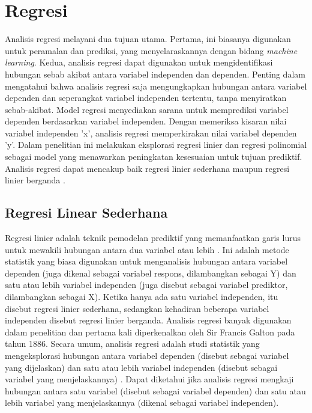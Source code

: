 \section{Regresi}
\label{sec:regresi}

Analisis regresi melayani dua tujuan utama. Pertama, ini biasanya digunakan untuk peramalan dan prediksi, yang menyelaraskannya dengan bidang \emph{machine learning}. Kedua, analisis regresi dapat digunakan untuk mengidentifikasi hubungan sebab akibat antara variabel independen dan dependen. Penting dalam mengatahui bahwa analisis regresi saja mengungkapkan hubungan antara variabel dependen dan seperangkat variabel independen tertentu, tanpa menyiratkan sebab-akibat. Model regresi menyediakan sarana untuk memprediksi variabel dependen berdasarkan variabel independen. Dengan memeriksa kisaran nilai variabel independen 'x', analisis regresi memperkirakan nilai variabel dependen 'y'. Dalam penelitian ini melakukan eksplorasi regresi linier dan regresi polinomial sebagai model yang menawarkan peningkatan kesesuaian untuk tujuan prediktif. Analisis regresi dapat mencakup baik regresi linier sederhana maupun regresi linier berganda \parencite{Maulud}.

\subsection{Regresi Linear Sederhana}
\label{subsec:regresilinearsederhana}

Regresi linier adalah teknik pemodelan prediktif yang memanfaatkan garis lurus untuk mewakili hubungan antara dua variabel atau lebih \parencite{Kurniawan}. Ini adalah metode statistik yang biasa digunakan untuk menganalisis hubungan antara variabel dependen (juga dikenal sebagai variabel respons, dilambangkan sebagai Y) dan satu atau lebih variabel independen (juga disebut sebagai variabel prediktor, dilambangkan sebagai X). Ketika hanya ada satu variabel independen, itu disebut regresi linier sederhana, sedangkan kehadiran beberapa variabel independen disebut regresi linier berganda. Analisis regresi banyak digunakan dalam penelitian dan pertama kali diperkenalkan oleh Sir Francis Galton pada tahun 1886. Secara umum, analisis regresi adalah studi statistik yang mengeksplorasi hubungan antara variabel dependen (disebut sebagai variabel yang dijelaskan) dan satu atau lebih variabel independen (disebut sebagai variabel yang menjelaskannya) \parencite{Syilfi}. Dapat diketahui jika analisis regresi mengkaji hubungan antara satu variabel (disebut sebagai variabel dependen) dan satu atau lebih variabel yang menjelaskannya (dikenal sebagai variabel independen).

